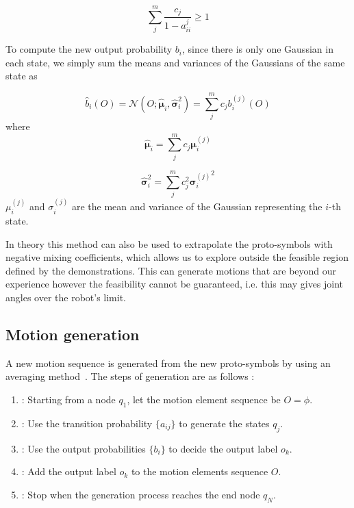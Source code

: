 \begin{equation}
\sum_j^m\frac{c_j}{1-a^j_{ii}} \ge 1
\end{equation}

To compute the new output probability $b_i$, since there is only one Gaussian in each state, we simply sum the means and variances of the Gaussians of the same state as

\begin{equation}
\hat{b}_i(O) = \mathcal{N}(O;\hat{\boldsymbol{\mu}}_i,\hat{\boldsymbol{\sigma}}_i^2) = \sum_j^m{c_jb_i^{(j)}(O)}
\end{equation}
where
\begin{equation}
\hat{\boldsymbol{\mu}}_i = \sum_j^mc_j\boldsymbol{\mu}_i^{(j)}
\end{equation}

\begin{equation}
\hat{\boldsymbol{\sigma}}_i^2 = \sum_j^mc_j^2{\boldsymbol{\sigma}_i^{(j)}}^2
\end{equation}
$\mu_i^{(j)}$ and ${\sigma_i^{(j)}}$ are the mean and variance of the Gaussian representing the $i$-th state.

In theory this method can also be used to extrapolate the proto-symbols with negative mixing coefficients, which allows us to explore outside the feasible region defined by the demonstrations. This can generate motions that are beyond our experience however the feasibility cannot be guaranteed, i.e. this may gives joint angles over the robot's limit.

\subsection{Motion generation}
\label{cha5:sec2:generating}
A new motion sequence is generated from the new proto-symbols by using an averaging method~\citep{inamura2004embodied}.
The steps of generation are as follows :

\begin{enumerate}
\item: Starting from a node $q_1$, let the motion element sequence be $O = \phi$.
\item: Use the transition probability $\{a_{ij}\}$ to generate the states $q_j$.
\item: Use the output probabilities $\{b_i\}$ to decide the output label $o_k$.
\item: Add the output label $o_k$ to the motion elements sequence $O$.
\item: Stop when the generation process reaches the end node $q_N$.
\end{enumerate}

